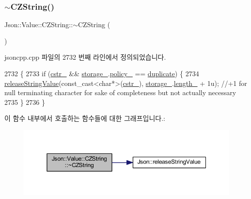 \mbox{\label{class_json_1_1_value_1_1_c_z_string_add6989dc7073646b95e5ebacb3f07d51}} 
\subsubsection{\texorpdfstring{$\sim$\+C\+Z\+String()}{~CZString()}}
{\footnotesize\ttfamily Json\+::\+Value\+::\+C\+Z\+String\+::$\sim$\+C\+Z\+String (\begin{DoxyParamCaption}{ }\end{DoxyParamCaption})}



jsoncpp.\+cpp 파일의 2732 번째 라인에서 정의되었습니다.


\begin{DoxyCode}
2732                          \{
2733   \textcolor{keywordflow}{if} (\hyperlink{class_json_1_1_value_1_1_c_z_string_a5b4d28349294034d7f779c3c95d0306c}{cstr\_} && \hyperlink{class_json_1_1_value_1_1_c_z_string_a17c92f0f089a4314e3b1d5695dc1a851}{storage\_}.\hyperlink{struct_json_1_1_value_1_1_c_z_string_1_1_string_storage_a7f68c8d6197c5692a525854b5f29f87b}{policy\_} == \hyperlink{class_json_1_1_value_1_1_c_z_string_a2805c46fb4a72bbaed55de6d75941b6dabb2134294dd8fc37dd82d18bb794fe20}{duplicate}) \{
2734       \hyperlink{namespace_json_a3e0d81d514d0e8bddf33b08074214abd}{releaseStringValue}(const\_cast<char*>(\hyperlink{class_json_1_1_value_1_1_c_z_string_a5b4d28349294034d7f779c3c95d0306c}{cstr\_}), 
      \hyperlink{class_json_1_1_value_1_1_c_z_string_a17c92f0f089a4314e3b1d5695dc1a851}{storage\_}.\hyperlink{struct_json_1_1_value_1_1_c_z_string_1_1_string_storage_a165d865c44e6471d34668eeb4f15b140}{length\_} + 1u); \textcolor{comment}{//+1 for null terminating character for sake of completeness but not
       actually necessary}
2735   \}
2736 \}
\end{DoxyCode}
이 함수 내부에서 호출하는 함수들에 대한 그래프입니다.\+:\nopagebreak
\begin{figure}[H]
\begin{center}
\leavevmode
\includegraphics[width=350pt]{class_json_1_1_value_1_1_c_z_string_add6989dc7073646b95e5ebacb3f07d51_cgraph}
\end{center}
\end{figure}


